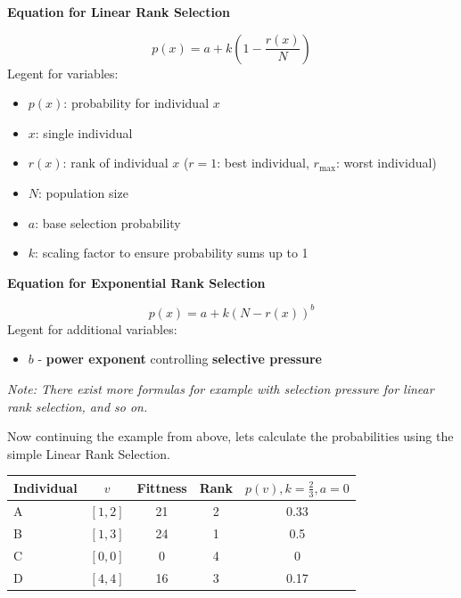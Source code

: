 \documentclass[11pt]{article}
\begin{document}
    \textbf{Equation for Linear Rank Selection}

    \begin{equation}
        p(x) = a + k\left( 1 - \frac{r(x)}{N} \right)
        \label{eq:linear-rank-select}
    \end{equation}
    Legent for variables:
    \begin{itemize}
        \item $p(x)$: probability for individual $x$
        \item $x$: single individual
        \item $r(x)$: rank of individual $x$ ($r = 1$: best individual, $r_{\max}$: worst individual)
        \item $N$: population size
        \item $a$: base selection probability
        \item $k$: scaling factor to ensure probability sums up to 1\\
    \end{itemize}

    \textbf{Equation for Exponential Rank Selection}

    \begin{equation}
        p(x) = a + k\left( N - r(x) \right)^b
        \label{eq:exponential-rank-select}
    \end{equation}
    Legent for additional variables:
    \begin{itemize}
        \item $b$ - \textbf{power exponent} controlling \textbf{selective pressure}
    \end{itemize}

    \textit{Note: There exist more formulas for example with selection pressure for linear rank selection, and so on.}

    Now continuing the example from above, lets calculate the probabilities using the simple Linear Rank Selection.

    \begin{table}[h!]
        \centering
        \begin{tabular}{|l|c|c|c|c|}
            \hline
            \textbf{Individual} & \textbf{$v$} & \textbf{Fittness} & \textbf{Rank} & \textbf{$p(v), k=\frac{2}{3}, a=0$} \\
            \hline
            A                   & $[1, 2]$     & 21                & 2             & 0.33                                \\
            B                   & $[1, 3]$     & 24                & 1             & 0.5                                 \\
            C                   & $[0, 0]$     & 0                 & 4             & 0                                   \\
            D                   & $[4, 4]$     & 16                & 3             & 0.17                                \\
            \hline
        \end{tabular}
        \label{tab:linear-rank}
    \end{table}
\end{document}
